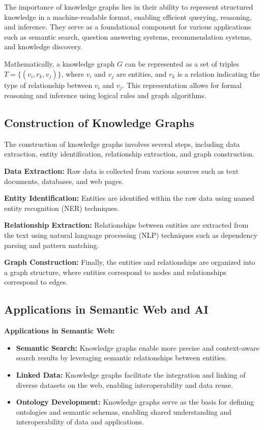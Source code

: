 \documentclass[12pt]{book} %
\begin{document}
The importance of knowledge graphs lies in their ability to represent structured knowledge in a machine-readable format, enabling efficient querying, reasoning, and inference. They serve as a foundational component for various applications such as semantic search, question answering systems, recommendation systems, and knowledge discovery.

Mathematically, a knowledge graph \(G\) can be represented as a set of triples \(T = \{(v_i, r_k, v_j)\}\), where \(v_i\) and \(v_j\) are entities, and \(r_k\) is a relation indicating the type of relationship between \(v_i\) and \(v_j\). This representation allows for formal reasoning and inference using logical rules and graph algorithms.

\subsection{Construction of Knowledge Graphs}

The construction of knowledge graphs involves several steps, including data extraction, entity identification, relationship extraction, and graph construction.

\textbf{Data Extraction:} Raw data is collected from various sources such as text documents, databases, and web pages.

\textbf{Entity Identification:} Entities are identified within the raw data using named entity recognition (NER) techniques.

\textbf{Relationship Extraction:} Relationships between entities are extracted from the text using natural language processing (NLP) techniques such as dependency parsing and pattern matching.

\textbf{Graph Construction:} Finally, the entities and relationships are organized into a graph structure, where entities correspond to nodes and relationships correspond to edges.

\subsection{Applications in Semantic Web and AI}

\textbf{Applications in Semantic Web:}
\begin{itemize}
    \item \textbf{Semantic Search:} Knowledge graphs enable more precise and context-aware search results by leveraging semantic relationships between entities.
    \item \textbf{Linked Data:} Knowledge graphs facilitate the integration and linking of diverse datasets on the web, enabling interoperability and data reuse.
    \item \textbf{Ontology Development:} Knowledge graphs serve as the basis for defining ontologies and semantic schemas, enabling shared understanding and interoperability of data and applications.
\end{itemize}
\end{document}
